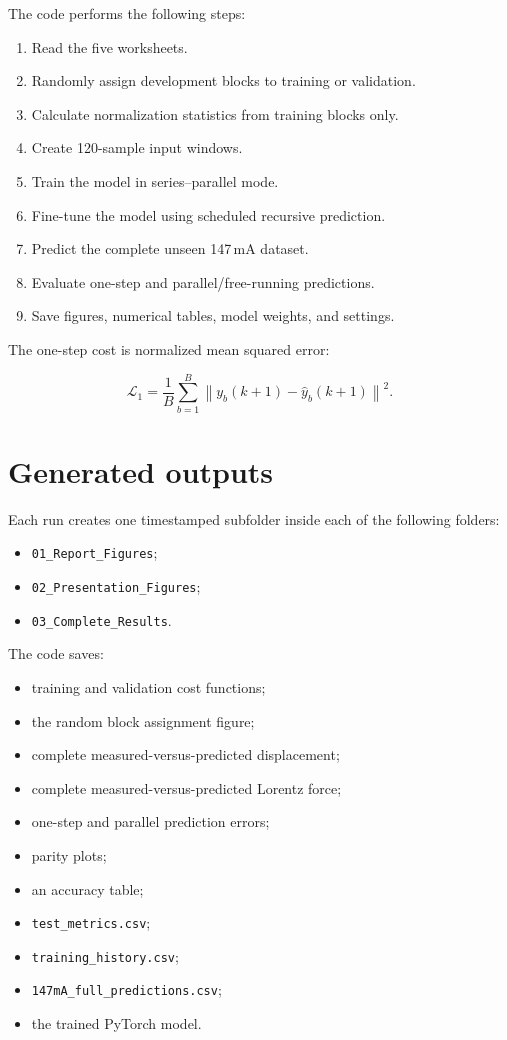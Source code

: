 \documentclass[11pt]{article}
\begin{document}
The code performs the following steps:

\begin{enumerate}[leftmargin=*]
\item Read the five worksheets.
\item Randomly assign development blocks to training or validation.
\item Calculate normalization statistics from training blocks only.
\item Create 120-sample input windows.
\item Train the model in series--parallel mode.
\item Fine-tune the model using scheduled recursive prediction.
\item Predict the complete unseen 147\,mA dataset.
\item Evaluate one-step and parallel/free-running predictions.
\item Save figures, numerical tables, model weights, and settings.
\end{enumerate}

The one-step cost is normalized mean squared error:

\[
\mathcal{L}_{1}
=
\frac{1}{B}
\sum_{b=1}^{B}
\left\|
y_b(k+1)
-
\hat y_b(k+1)
\right\|^2.
\]

\section{Generated outputs}

Each run creates one timestamped subfolder inside each of the following folders:

\begin{itemize}[leftmargin=*]
\item \texttt{01\_Report\_Figures};
\item \texttt{02\_Presentation\_Figures};
\item \texttt{03\_Complete\_Results}.
\end{itemize}

The code saves:

\begin{itemize}[leftmargin=*]
\item training and validation cost functions;
\item the random block assignment figure;
\item complete measured-versus-predicted displacement;
\item complete measured-versus-predicted Lorentz force;
\item one-step and parallel prediction errors;
\item parity plots;
\item an accuracy table;
\item \texttt{test\_metrics.csv};
\item \texttt{training\_history.csv};
\item \texttt{147mA\_full\_predictions.csv};
\item the trained PyTorch model.
\end{itemize}
\end{document}
